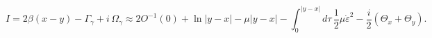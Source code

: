 \begin{equation}
I=2\beta (x- y) - \Gamma_\gamma + i\,\Omega_\gamma\approx 2O^{-1}(0)+\ln |y-x|-\mu |y-x| - \int_0^{|y-x|} d\tau\, \frac{1}{2}\mu \dot{\varepsilon}^2
-\frac{i}{2}(\Theta_x +\Theta_y).
\label{I1}
\end{equation}

